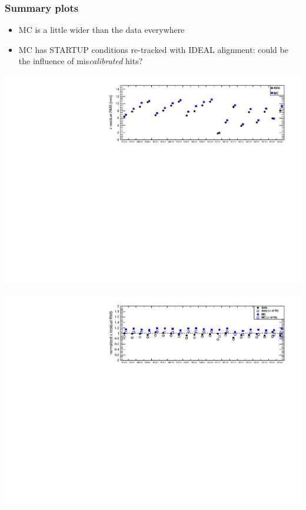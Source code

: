 \documentclass[compress]{beamer}
\begin{document}
\begin{frame}
\frametitle{Summary plots}

\begin{itemize}
\item MC is a little wider than the data everywhere
\item MC has STARTUP conditions re-tracked with IDEAL alignment: could
  be the influence of mis{\it calibrated} hits?
\end{itemize}
\begin{center}
\includegraphics[width=0.9\linewidth]{summaryX.pdf}

\includegraphics[width=0.9\linewidth]{summaryXnorm.pdf}
\end{center}
\end{frame}
\end{document}
